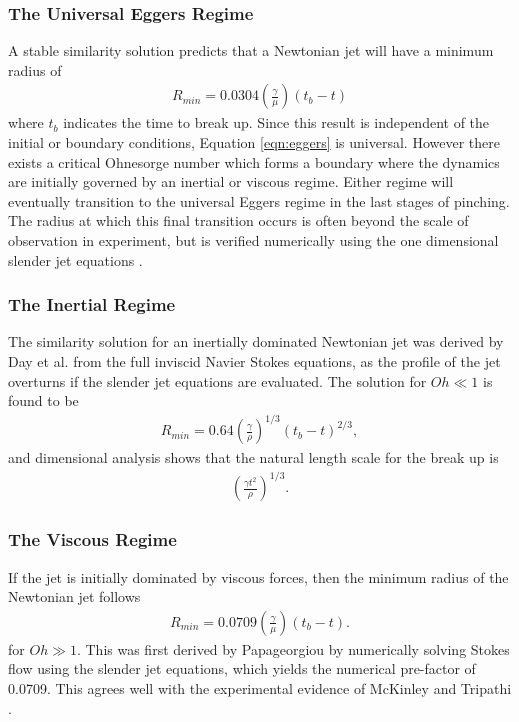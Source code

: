 \documentclass[11pt]{article}
\begin{document}
\subsubsection{The Universal Eggers Regime}
A stable similarity solution predicts that a Newtonian jet will have a minimum radius of
\begin{align}
R_{min} = 0.0304 \left( \frac{\gamma}{\mu} \right) \left(t_b - t \right)
\label{eqn:eggers}
\end{align}
where $t_b$ indicates the time to break up. Since this result is independent of the initial or boundary conditions, Equation \ref{eqn:eggers} is universal. However there exists a critical Ohnesorge number which forms a boundary where the dynamics are initially governed by an inertial or viscous regime. Either regime will eventually transition to the universal Eggers regime in the last stages of pinching. The radius at which this final transition occurs is often beyond the scale of observation in experiment, but is verified numerically using the one dimensional slender jet equations \cite{hall2015report}.

\subsubsection{The Inertial Regime}
The similarity solution for an inertially dominated Newtonian jet was derived by Day et al. \cite{day1998self} from the full inviscid Navier Stokes equations, as the profile of the jet overturns if the slender jet equations are evaluated. The solution for $Oh \ll 1$ is found to be
\begin{align}
R_{min} = 0.64 \left( \frac{\gamma}{\rho}\right)^{1/3} \left(t_b - t \right)^{2/3},
\end{align}
and dimensional analysis shows that the natural length scale for the break up is
\begin{align*}
\left( \frac{\gamma t^2}{\rho} \right)^{1/3}.
\end{align*}

\subsubsection{The Viscous Regime}
If the jet is initially dominated by viscous forces, then the minimum radius of the Newtonian jet follows
\begin{align}
R_{min} = 0.0709 \left( \frac{\gamma}{\mu} \right) \left(t_b -t \right).
\end{align}
for $Oh \gg 1$. This was first derived by Papageorgiou \cite{papageorgiou1995breakup} by numerically solving Stokes flow using the slender jet equations, which yields the numerical pre-factor of 0.0709. This agrees well with the experimental evidence of McKinley and Tripathi \cite{mckinley2000extract}.
\end{document}
